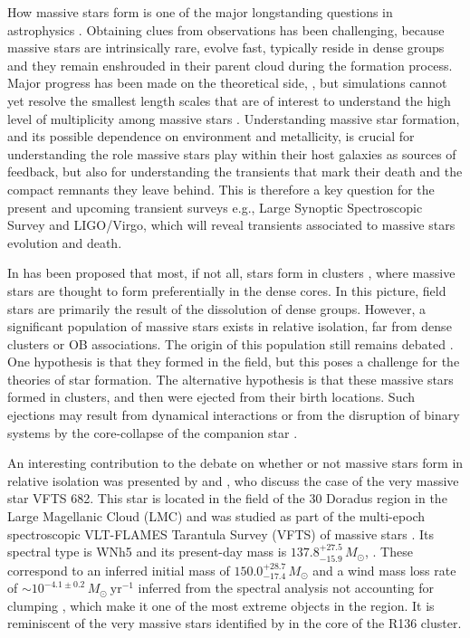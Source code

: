 \documentclass[apjl,twocolumn]{emulateapj}
\newcommand{\todo}[1]{{\large $\blacksquare$~\textbf{\color{red}[#1]}}~$\blacksquare$}
\begin{document}
How massive stars form is one of the major longstanding questions in astrophysics
\citep[e.g.,][]{zinnecker:07}. Obtaining clues from observations has been challenging, because massive stars are intrinsically rare, 
evolve fast, typically reside in dense groups and they remain enshrouded in their parent cloud during the formation
process. Major progress has been made on the theoretical side,
\citep[e.g.][]{kuiper:15,rosen:16}, but simulations cannot yet resolve
the smallest length scales that are of interest to understand the 
high level of multiplicity among massive stars  \citep[e.g.,][]{bate:09, sana:17}. Understanding massive star formation, and its
possible dependence on environment and metallicity, is crucial for
understanding the role massive stars play within their host galaxies
as sources of feedback, but also for understanding the transients that
mark their death and the compact remnants they leave behind. This is
therefore a key question for the present and upcoming transient
surveys e.g., Large Synoptic Spectroscopic Survey and LIGO/Virgo,
which  will reveal transients associated to massive stars
evolution and death.

In has been proposed that most, if not all, stars form in clusters \citep{lada:03}, where massive stars are thought to  form preferentially in the dense cores. In this picture, field stars are primarily the result of the dissolution of dense groups. 
However, a significant population of massive stars exists in relative
isolation,  far from dense clusters or OB associations. The origin of
this population still remains debated \citep{lamb:16,ward:18}.  One
hypothesis is that they  formed in the field, but this poses a
challenge for the theories of star formation. The alternative
hypothesis is that these massive stars formed in clusters, and then
were ejected from their birth locations. Such ejections may result
from dynamical interactions \citep[e.g.,][]{poveda:67} or from the disruption of binary systems by the core-collapse of the companion star \citep[e.g.,][]{zwicky:57, blaauw:61}. 
 
An interesting contribution to the debate on whether or not massive
stars form in relative isolation was presented by
\cite{bestenlehner:11} and \cite{bressert:12}, who discuss the case of the very massive star
VFTS 682.  This star is located in the field of the 30 Doradus region
in the Large Magellanic Cloud (LMC) and was studied as part of the
multi-epoch spectroscopic VLT-FLAMES Tarantula Survey (VFTS) of
massive stars \citep{evans:11}. Its spectral type is WNh5 and its 
present-day mass is $137.8^{+27.5}_{-15.9}\,M_\odot$,
\citep{schneider:18}. These correspond to an inferred initial mass of
$150.0^{+28.7}_{-17.4}\,M_\odot$ and a wind mass loss rate of
$\sim10^{-4.1\pm0.2}\,M_\odot \ \mathrm{yr}^{-1}$ inferred from the
spectral analysis not accounting for clumping
\citep[][]{bestenlehner:11}, which make it one of the
most extreme objects in the region. It is reminiscent of the very
massive stars %
identified by
\citet{crowther:10, crowther:16} in the core of the
R136 cluster. 
 
\end{document}
